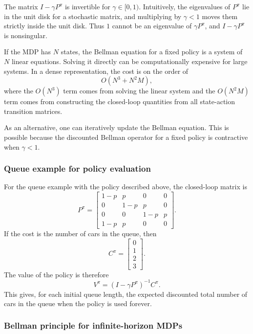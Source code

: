 The matrix \(I-\gamma P^\pi\) is invertible for \(\gamma\in[0,1)\). Intuitively, the eigenvalues
of \(P^\pi\) lie in the unit disk for a stochastic matrix, and multiplying by \(\gamma<1\) moves
them strictly inside the unit disk. Thus \(1\) cannot be an eigenvalue of \(\gamma P^\pi\), and
\(I-\gamma P^\pi\) is nonsingular.

If the MDP has \(N\) states, the Bellman equation for a fixed policy is a system of \(N\)
linear equations. Solving it directly can be computationally expensive for large systems. In a
dense representation, the cost is on the order of
\[
O(N^3+N^2M),
\]
where the \(O(N^3)\) term comes from solving the linear system and the \(O(N^2M)\) term comes
from constructing the closed-loop quantities from all state-action transition matrices.

As an alternative, one can iteratively update the Bellman equation. This is possible because the
discounted Bellman operator for a fixed policy is contractive when \(\gamma<1\).

\subsubsection{Queue example for policy evaluation}

For the queue example with the policy described above, the closed-loop matrix is
\[
P^\pi
=
\begin{bmatrix}
1-p & p   & 0   & 0\\
0   & 1-p & p   & 0\\
0   & 0   & 1-p & p\\
1-p & p   & 0   & 0
\end{bmatrix}.
\]
If the cost is the number of cars in the queue, then
\[
C^\pi
=
\begin{bmatrix}
0\\
1\\
2\\
3
\end{bmatrix}.
\]
The value of the policy is therefore
\[
V^\pi
=
(I-\gamma P^\pi)^{-1}C^\pi.
\]
This gives, for each initial queue length, the expected discounted total number of cars in the
queue when the policy is used forever.

\subsubsection{Bellman principle for infinite-horizon MDPs}

